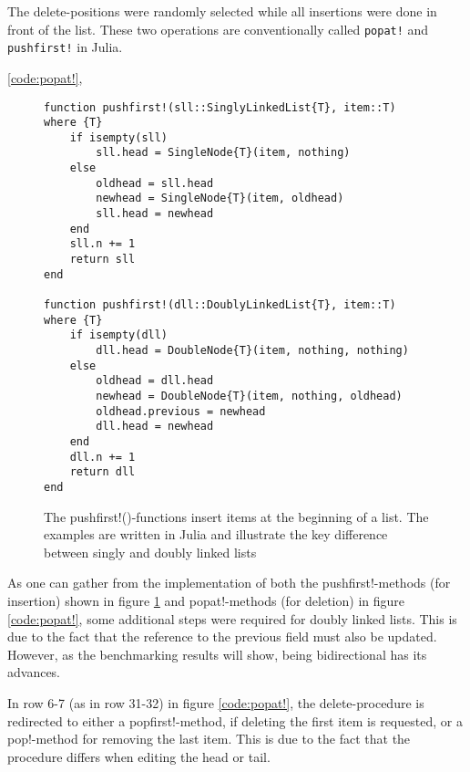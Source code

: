 \documentclass[a4paper, 11pt]{article}
\begin{document}
    The delete-positions were randomly selected while all insertions were done
    in front of the list. These two operations are conventionally
    called
    \texttt{popat!} and \texttt{pushfirst!} in Julia. 


    \ref{code:popat!}, 
    \begin{figure}[H]
    \centering
    \begin{verbatim}
function pushfirst!(sll::SinglyLinkedList{T}, item::T) where {T}
    if isempty(sll)
        sll.head = SingleNode{T}(item, nothing)
    else
        oldhead = sll.head
        newhead = SingleNode{T}(item, oldhead)
        sll.head = newhead
    end
    sll.n += 1
    return sll
end

function pushfirst!(dll::DoublyLinkedList{T}, item::T) where {T}
    if isempty(dll)
        dll.head = DoubleNode{T}(item, nothing, nothing)
    else
        oldhead = dll.head
        newhead = DoubleNode{T}(item, nothing, oldhead)
        oldhead.previous = newhead
        dll.head = newhead
    end
    dll.n += 1
    return dll
end
    \end{verbatim}
    \caption{The pushfirst!()-functions insert items at the beginning of a list. The
    examples are written in Julia and illustrate the key difference between singly
    and doubly linked lists}
    \label{code:pushfirst!}
    \end{figure}

    As one can gather from the implementation of both the pushfirst!-methods (for insertion) shown in
    figure \ref{code:pushfirst!} and popat!-methods (for deletion) in figure
    \ref{code:popat!}, 
    some additional steps were required for doubly linked lists. This is due to
    the fact that the reference to the previous field must also be updated.
    However, as the benchmarking results will show, being bidirectional has its advances.  
    
    In row 6-7 (as in row 31-32) in figure \ref{code:popat!}, the delete-procedure is redirected to 
    either a popfirst!-method, if deleting the first item is requested, or a pop!-method for
    removing the last item. This is due to the fact that the procedure differs when editing the head or tail.
    
\end{document}
